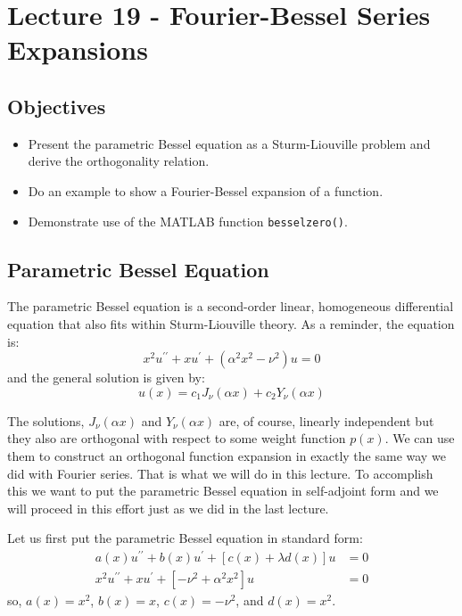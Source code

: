 \chapter{Lecture 19 - Fourier-Bessel Series Expansions}
\label{ch:lec19}
\section{Objectives}
\begin{itemize}
\item Present the parametric Bessel equation as a Sturm-Liouville problem and derive the orthogonality relation.
\item Do an example to show a Fourier-Bessel expansion of a function.
\item Demonstrate use of the MATLAB function \lstinline{besselzero()}.
\end{itemize}

\section{Parametric Bessel Equation}
The parametric Bessel equation is a second-order linear, homogeneous differential equation that also fits within Sturm-Liouville theory.  As a reminder, the equation is:
\begin{equation*}
x^2u^{\prime \prime} + xu^{\prime} + \left(\alpha^2x^2-\nu^2\right)u = 0
\end{equation*}
and the general solution is given by:
\begin{equation*}
u(x) = c_1J_{\nu}(\alpha x) + c_2Y_{\nu}(\alpha x)
\end{equation*}

\noindent The solutions, $J_{\nu}(\alpha x)$ and $Y_{\nu}(\alpha x)$ are, of course, linearly independent but they also are orthogonal with respect to some weight function $p(x)$.  We can use them to construct an orthogonal function expansion in exactly the same way we did with Fourier series.  That is what we will do in this lecture.  To accomplish this we want to put the parametric Bessel equation in self-adjoint form and we will proceed in this effort just as we did in the last lecture.

\vspace{0.5cm}

\noindent Let us first put the parametric Bessel equation in standard form:
\begin{align*}
a(x)u^{\prime \prime} + b(x)u^{\prime} + \left[c(x)+\lambda d(x) \right] u &= 0 \\
x^2u^{\prime \prime} + xu^{\prime} + \left[-\nu^2 + \alpha^2 x^2\right]u &=0
\end{align*}
so, $a(x) = x^2$, $b(x)=x$, $c(x) = -\nu^2$, and $d(x)=x^2$.

